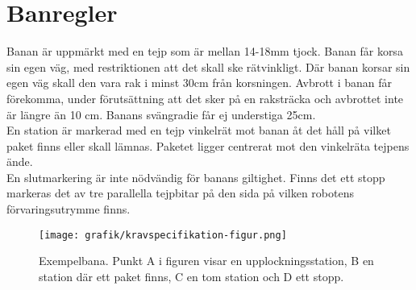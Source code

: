 \section{Banregler} \label{banregler}

Banan är uppmärkt med en tejp som är mellan 14-18mm tjock. Banan får korsa sin egen väg, med restriktionen att det skall ske rätvinkligt. Där banan korsar sin egen väg skall den vara rak i minst 30cm från korsningen. Avbrott i banan får förekomma, under förutsättning att det sker på en raksträcka och avbrottet inte är längre än 10 cm. Banans svängradie får ej understiga 25cm. \\
En station är markerad med en tejp vinkelrät mot banan åt det håll på vilket paket finns eller skall lämnas. Paketet ligger centrerat mot den vinkelräta tejpens ände. \\
En slutmarkering är inte nödvändig för banans giltighet. Finns det ett stopp markeras det av tre parallella tejpbitar på den sida på vilken robotens förvaringsutrymme finns. \\

\begin{figure}[h]
\center
\texttt{[image: grafik/kravspecifikation-figur.png]}
\endcenter
\caption{Exempelbana. Punkt A i figuren visar en upplockningsstation, B en station där ett paket finns, C en tom station och D ett stopp.}
\end{figure}
